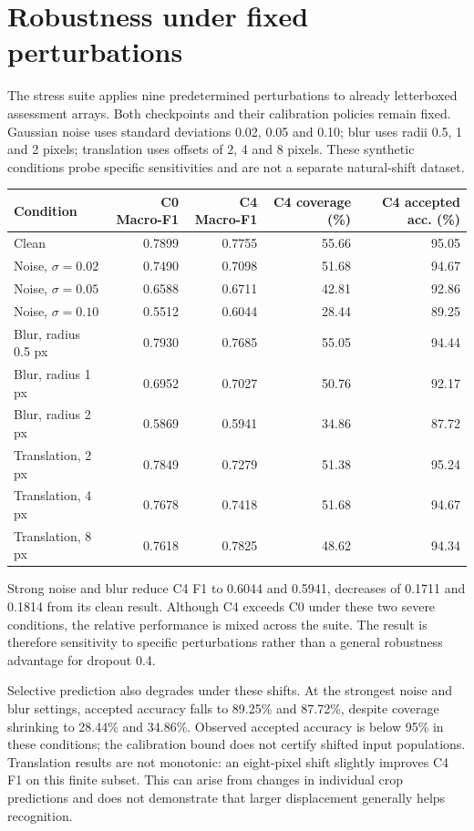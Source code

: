 \clearpage
\section{Robustness under fixed perturbations}
The stress suite applies nine predetermined perturbations to already letterboxed assessment arrays. Both checkpoints and their calibration policies remain fixed. Gaussian noise uses standard deviations 0.02, 0.05 and 0.10; blur uses radii 0.5, 1 and 2 pixels; translation uses offsets of 2, 4 and 8 pixels. These synthetic conditions probe specific sensitivities and are not a separate natural-shift dataset.

\begin{center}\small
\begin{tabular}{lrrrr}\toprule
Condition & C0 Macro-F1 & C4 Macro-F1 & C4 coverage (\%) & C4 accepted acc. (\%)\\\midrule
Clean & 0.7899 & 0.7755 & 55.66 & 95.05\\
Noise, $\sigma=0.02$ & 0.7490 & 0.7098 & 51.68 & 94.67\\
Noise, $\sigma=0.05$ & 0.6588 & 0.6711 & 42.81 & 92.86\\
Noise, $\sigma=0.10$ & 0.5512 & 0.6044 & 28.44 & 89.25\\
Blur, radius 0.5 px & 0.7930 & 0.7685 & 55.05 & 94.44\\
Blur, radius 1 px & 0.6952 & 0.7027 & 50.76 & 92.17\\
Blur, radius 2 px & 0.5869 & 0.5941 & 34.86 & 87.72\\
Translation, 2 px & 0.7849 & 0.7279 & 51.38 & 95.24\\
Translation, 4 px & 0.7678 & 0.7418 & 51.68 & 94.67\\
Translation, 8 px & 0.7618 & 0.7825 & 48.62 & 94.34\\\bottomrule
\end{tabular}\end{center}
Strong noise and blur reduce C4 F1 to 0.6044 and 0.5941, decreases of 0.1711 and 0.1814 from its clean result. Although C4 exceeds C0 under these two severe conditions, the relative performance is mixed across the suite. The result is therefore sensitivity to specific perturbations rather than a general robustness advantage for dropout 0.4.

Selective prediction also degrades under these shifts. At the strongest noise and blur settings, accepted accuracy falls to 89.25\% and 87.72\%, despite coverage shrinking to 28.44\% and 34.86\%. Observed accepted accuracy is below 95\% in these conditions; the calibration bound does not certify shifted input populations. Translation results are not monotonic: an eight-pixel shift slightly improves C4 F1 on this finite subset. This can arise from changes in individual crop predictions and does not demonstrate that larger displacement generally helps recognition.

